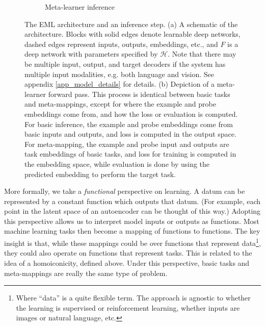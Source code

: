\documentclass{article}
\begin{document}
\begin{figure}
\begin{subfigure}[b]{0.28\textwidth}
\caption{Meta-learner inference}
\end{subfigure}
\caption{The EML architecture and an inference step. (a) A schematic of the architecture. Blocks with solid edges denote learnable deep networks, dashed edges represent inputs, outputs, embeddings, etc., and $F$ is a deep network with parameters specified by $\mathcal{H}$. Note that there may be multiple input, output, and target decoders if the system has multiple input modalities, e.g. both language and vision. See appendix \ref{app_model_details} for details. (b) Depiction of a meta-learner forward pass. This process is identical between basic tasks and meta-mappings, except for where the example and probe embeddings come from, and how the loss or evaluation is computed. For basic inference, the example and probe embeddings come from basic inputs and outputs, and loss is computed in the output space. For meta-mapping, the example and probe input and outputs are task embeddings of basic tasks, and loss for training is computed in the embedding space, while evaluation is done by using the predicted embedding to perform the target task.} \label{architecture_inference_fig}
\end{figure}
More formally, we take a \emph{functional} perspective on learning. A datum can be represented by a constant function which outputs that datum. (For example, each point in the latent space of an autoencoder can be thought of this way.) Adopting this perspective allows us to interpret model inputs or outputs as functions. Most machine learning tasks then become a mapping of functions to functions. The key insight is that, while these mappings could be over functions that represent data\footnote{Where ``data'' is a quite flexible term. The approach is agnostic to whether the learning is supervised or reinforcement learning, whether inputs are images or natural language, etc.}, they could also operate on functions that represent tasks. This is related to the idea of a homoiconicity, defined above. Under this perspective, basic tasks and meta-mappings are really the same type of problem. \par
\end{document}
